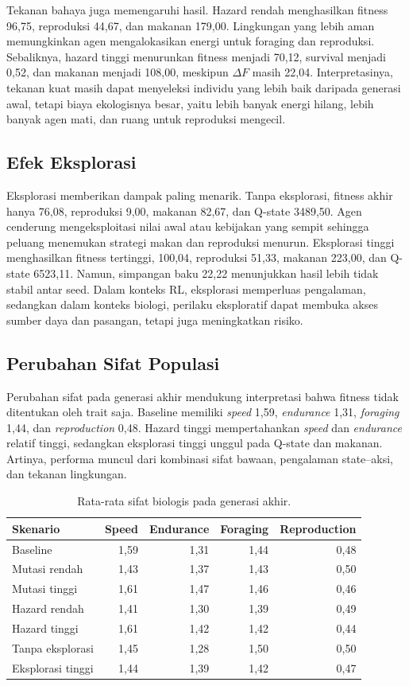 \documentclass[10pt]{article}
\begin{document}
Tekanan bahaya juga memengaruhi hasil. Hazard rendah menghasilkan fitness 96,75, reproduksi 44,67, dan makanan 179,00. Lingkungan yang lebih aman memungkinkan agen mengalokasikan energi untuk foraging dan reproduksi. Sebaliknya, hazard tinggi menurunkan fitness menjadi 70,12, survival menjadi 0,52, dan makanan menjadi 108,00, meskipun $\Delta F$ masih 22,04. Interpretasinya, tekanan kuat masih dapat menyeleksi individu yang lebih baik daripada generasi awal, tetapi biaya ekologisnya besar, yaitu lebih banyak energi hilang, lebih banyak agen mati, dan ruang untuk reproduksi mengecil.

\subsection{Efek Eksplorasi}
Eksplorasi memberikan dampak paling menarik. Tanpa eksplorasi, fitness akhir hanya 76,08, reproduksi 9,00, makanan 82,67, dan Q-state 3489,50. Agen cenderung mengeksploitasi nilai awal atau kebijakan yang sempit sehingga peluang menemukan strategi makan dan reproduksi menurun. Eksplorasi tinggi menghasilkan fitness tertinggi, 100,04, reproduksi 51,33, makanan 223,00, dan Q-state 6523,11. Namun, simpangan baku 22,22 menunjukkan hasil lebih tidak stabil antar seed. Dalam konteks RL, eksplorasi memperluas pengalaman, sedangkan dalam konteks biologi, perilaku eksploratif dapat membuka akses sumber daya dan pasangan, tetapi juga meningkatkan risiko.

\subsection{Perubahan Sifat Populasi}
Perubahan sifat pada generasi akhir mendukung interpretasi bahwa fitness tidak ditentukan oleh trait saja. Baseline memiliki \textit{speed} 1,59, \textit{endurance} 1,31, \textit{foraging} 1,44, dan \textit{reproduction} 0,48. Hazard tinggi mempertahankan \textit{speed} dan \textit{endurance} relatif tinggi, sedangkan eksplorasi tinggi unggul pada Q-state dan makanan. Artinya, performa muncul dari kombinasi sifat bawaan, pengalaman state--aksi, dan tekanan lingkungan.

\begin{table}[h]
\centering
\caption{Rata-rata sifat biologis pada generasi akhir.}
\label{tab:sifat}
\begin{tabular}{lrrrr}
\toprule
Skenario & Speed & Endurance & Foraging & Reproduction \\
\midrule
Baseline & 1,59 & 1,31 & 1,44 & 0,48 \\
Mutasi rendah & 1,43 & 1,37 & 1,43 & 0,50 \\
Mutasi tinggi & 1,61 & 1,47 & 1,46 & 0,46 \\
Hazard rendah & 1,41 & 1,30 & 1,39 & 0,49 \\
Hazard tinggi & 1,61 & 1,42 & 1,42 & 0,44 \\
Tanpa eksplorasi & 1,45 & 1,28 & 1,50 & 0,50 \\
Eksplorasi tinggi & 1,44 & 1,39 & 1,42 & 0,47 \\
\bottomrule
\end{tabular}
\end{table}
\end{document}
